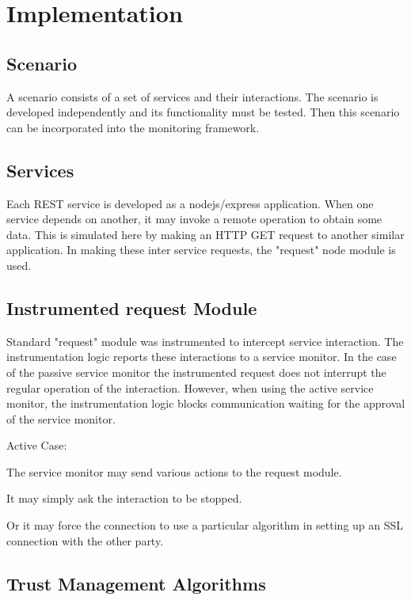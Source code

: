 \section{Implementation}

\subsection{Scenario}
A scenario consists of a set of services and their interactions. The scenario is developed independently and its functionality must be tested. Then this scenario can be incorporated into the monitoring framework. 

\subsection{Services}
Each REST service is developed as a nodejs/express application. When one service depends on another, it may invoke a remote operation to obtain some data. This is simulated here by making an HTTP GET request to another similar application. In making these inter service requests, the "request" node module is used. 

\subsection{Instrumented request Module}
Standard "request" module was instrumented to intercept service interaction. The instrumentation logic reports these interactions to a service monitor. 
In the case of the passive service monitor the instrumented request does not interrupt the regular operation of the interaction. However, when using the active service monitor, the instrumentation logic blocks communication waiting for the approval of the service monitor. 


Active Case:

The service monitor may send various actions to the request module. 

It may simply ask the interaction to be stopped. 

Or it may force the connection to use a particular algorithm in setting up an SSL connection with the other party. 

\subsection{Trust Management Algorithms}
